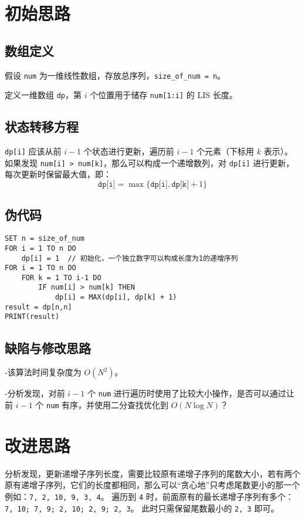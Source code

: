 \documentclass[UTF8]{ctexart}
\begin{document}
\section{初始思路}

\subsection{数组定义}
假设 \texttt{num} 为一维线性数组，存放总序列，\texttt{size\_of\_num = n}。

定义一维数组 \texttt{dp}，第 $i$ 个位置用于储存 \texttt{num[1:i]} 的 LIS 长度。

\subsection{状态转移方程}
\texttt{dp[i]} 应该从前 $i-1$ 个状态进行更新，遍历前 $i-1$ 个元素（下标用 $k$ 表示）。  
如果发现 \texttt{num[i] > num[k]}，那么可以构成一个递增数列，对 \texttt{dp[i]} 进行更新，每次更新时保留最大值，即：
\[
\texttt{dp[i]} = \max\{\texttt{dp[i]},\texttt{dp[k]} + 1\}
\]

\subsection{伪代码}
\begin{lstlisting}[caption={O(N\textsuperscript{2}) 解法}]
SET n = size_of_num
FOR i = 1 TO n DO
    dp[i] = 1  // 初始化，一个独立数字可以构成长度为1的递增序列
FOR i = 1 TO n DO
    FOR k = 1 TO i-1 DO
        IF num[i] > num[k] THEN
            dp[i] = MAX(dp[i], dp[k] + 1)
result = dp[n,n]
PRINT(result)
\end{lstlisting}

\subsection{缺陷与修改思路}
\noindent -该算法时间复杂度为 $O(N^2)$。

\noindent -分析发现，对前 $i-1$ 个 \texttt{num} 进行遍历时使用了比较大小操作，是否可以通过让前 $i-1$ 个 \texttt{num} 有序，并使用二分查找优化到 $O(N\log N)$？

\section{改进思路}
分析发现，更新递增子序列长度，需要比较原有递增子序列的尾数大小，若有两个原有递增子序列，它们的长度都相同，那么可以“贪心地”只考虑尾数更小的那一个
例如：\texttt{7, 2, 10, 9, 3, 4}。  
遍历到 \texttt{4} 时，前面原有的最长递增子序列有多个：
\texttt{7, 10; 7, 9; 2, 10; 2, 9; 2, 3}。  
此时只需保留尾数最小的 \texttt{2, 3} 即可。
\end{document}
